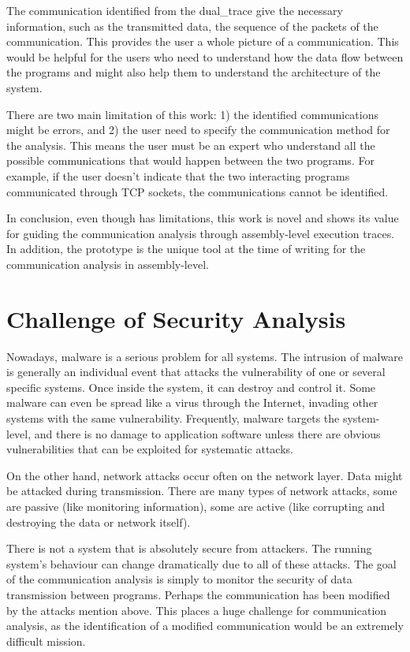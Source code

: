 The communication identified from the dual\_trace give the necessary information, such as the transmitted data, the sequence of the packets of the communication. This provides the user a whole picture of a communication. This would be helpful for the users who need to understand how the data flow between the programs and might also help them to understand the architecture of the system. 

There are two main limitation of this work: 1) the identified communications might be errors, and 2) the user need to specify the communication method for the analysis. This means the user must be an expert who understand all the possible communications that would happen between the two programs. For example, if the user doesn't indicate that the two interacting programs communicated through TCP sockets, the communications cannot be identified. 

In conclusion, even though has limitations, this work is novel and shows its value for guiding the communication analysis through assembly-level execution traces. In addition, the prototype is the unique tool at the time of writing for the communication analysis in assembly-level.

\section{Challenge of Security Analysis}
Nowadays, malware is a serious problem for all systems. The intrusion of malware is generally an individual event that attacks the vulnerability of one or several specific systems. Once inside the system, it can destroy and control it. Some malware can even be spread like a virus through the Internet, invading other systems with the same vulnerability. Frequently, malware targets the system-level, and there is no damage to application software unless there are obvious vulnerabilities that can be exploited for systematic attacks. \cite{leavitt2011mobile}

On the other hand, network attacks occur often on the network layer. Data might be attacked during transmission. There are many types of network attacks, some are passive  (like monitoring information), some are active (like corrupting and destroying the data or network itself). \cite{hansman2005taxonomy}

There is not a system that is absolutely secure from attackers. The running system's behaviour can change dramatically due to all of these attacks. The goal of the communication analysis is simply to monitor the security of data transmission between programs. Perhaps the communication has been modified by the attacks mention above. This places a huge challenge for communication analysis, as the identification of  a modified communication would be an extremely difficult mission. 

